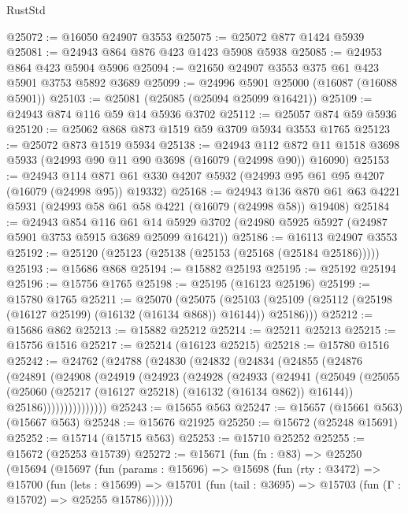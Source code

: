 \begin{lexlean}{RustStd}
\begin{coremodule}
@25072 := @16050 @24907 @3553
@25075 := @25072 @877 @1424 @5939
@25081 := @24943 @864 @876 @423 @1423 @5908 @5938
@25085 := @24953 @864 @423 @5904 @5906
@25094 := @21650 @24907 @3553 @375 @61 @423 @5901 @3753 @5892 @3689
@25099 := @24996 @5901 @25000 (@16087 (@16088 @5901))
@25103 := @25081 (@25085 (@25094 @25099 @16421))
@25109 := @24943 @874 @116 @59 @14 @5936 @3702
@25112 := @25057 @874 @59 @5936
@25120 := @25062 @868 @873 @1519 @59 @3709 @5934 @3553 @1765
@25123 := @25072 @873 @1519 @5934
@25138 := @24943
    @112
    @872
    @11
    @1518
    @3698
    @5933
    (@24993 @90 @11 @90 @3698 (@16079 (@24998 @90)) @16090)
@25153 := @24943
    @114
    @871
    @61
    @330
    @4207
    @5932
    (@24993 @95 @61 @95 @4207 (@16079 (@24998 @95)) @19332)
@25168 := @24943
    @136
    @870
    @61
    @63
    @4221
    @5931
    (@24993 @58 @61 @58 @4221 (@16079 (@24998 @58)) @19408)
@25184 := @24943
    @854
    @116
    @61
    @14
    @5929
    @3702
    (@24980 @5925 @5927 (@24987 @5901 @3753 @5915 @3689 @25099 @16421))
@25186 := @16113 @24907 @3553
@25192 := @25120 (@25123 (@25138 (@25153 (@25168 (@25184 @25186)))))
@25193 := @15686 @868
@25194 := @15882 @25193
@25195 := @25192 @25194
@25196 := @15756 @1765
@25198 := @25195 (@16123 @25196)
@25199 := @15780 @1765
@25211 := @25070
    (@25075
      (@25103 (@25109 (@25112 (@25198 (@16127 @25199) (@16132 (@16134 @868)) @16144)) @25186)))
@25212 := @15686 @862
@25213 := @15882 @25212
@25214 := @25211 @25213
@25215 := @15756 @1516
@25217 := @25214 (@16123 @25215)
@25218 := @15780 @1516
@25242 := @24762
    (@24788
      (@24830
        (@24832
          (@24834
            (@24855
              (@24876
                (@24891
                  (@24908
                    (@24919
                      (@24923
                        (@24928
                          (@24933
                            (@24941
                              (@25049
                                (@25055
                                  (@25060 (@25217 (@16127 @25218) (@16132 (@16134 @862)) @16144))
                                  @25186)))))))))))))))
@25243 := @15655 @563
@25247 := @15657 (@15661 @563) (@15667 @563)
@25248 := @15676 @21925
@25250 := @15672 (@25248 @15691)
@25252 := @15714 (@15715 @563)
@25253 := @15710 @25252
@25255 := @15672 (@25253 @15739)
@25272 := @15671
    (fun (fn : @83) =>
    @25250
      (@15694
        (@15697
          (fun (params : @15696) =>
          @15698
            (fun (rty : @3472) =>
            @15700
              (fun (lets : @15699) =>
              @15701 (fun (tail : @3695) => @15703 (fun (Γ : @15702) => @25255 @15786))))))

\end{coremodule}
\end{lexlean}
